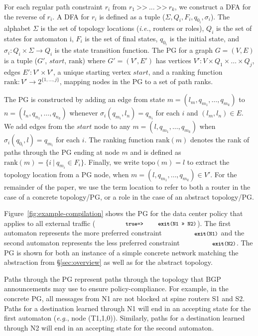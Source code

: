 \documentclass[numbers, 10pt, preprint]{sigplanconf}
\newcommand{\EG}{\emph{e.g.}}
\newcommand{\IE}{\emph{i.e.}}
\newcommand{\set}[1]{\ensuremath{\{ #1 \} }}
\newcommand{\CD}[1]{\texttt{\small #1}}
\newcommand{\KW}[1]{\texttt{\small\bfseries{#1}}}
\newcommand{\True}{\CD{true}}
\newcommand{\Prefer}{\texttt{>>}}
\newcommand{\Path}{\texttt{=>}}
\newcommand{\Exit}{\KW{exit}}
\newcommand{\Topo}[1]{\ensuremath{{\mathrm{topo}}(#1)}}
\newcommand{\Pref}{\ensuremath{\mathrm{rank}}}
\begin{document}
For each regular path constraint $r_i$ from $r_1 ~\Prefer~ ... ~\Prefer~ r_k$, we construct a DFA for the reverse of $r_i$. A DFA for $r_i$ is defined as a tuple ($\Sigma, Q_i, F_i, q_{0_i}, \sigma_i$). The alphabet $\Sigma$ is the set of topology locations (\IE, routers or roles), $Q_i$ is the set of states for automaton i, $F_i$ is the set of final states, $q_{0_i}$ is the initial state, and $\sigma_i \colon Q_i \times \Sigma \rightarrow Q_i$ is the state transition function.
%
The PG for a graph $G=(V,E)$ is a tuple ($G'$, $start$, \Pref) where $G' = (V',E')$ has
vertices $V' \colon V \times Q_1 \times \dots \times Q_j$,
edges $E' \colon V' \times V'$,
a unique starting vertex $start$,
and a ranking function $\Pref \colon V' \rightarrow 2^{\set{1, \dots, j}}$, mapping nodes in the PG to a set of path ranks.

The PG is constructed by adding an edge from state $m = (l_m, q_{m_1}, \dots, q_{m_k})$ to $n = (l_n, q_{n_1}, \dots, q_{n_k})$ whenever $\sigma_i(q_{m_i}, l_n) = q_{n_i}$ for each $i$ and $(l_m,l_n) \in E$.
%
We add edges from the $\mathit{start}$ node to any $m = (l, q_{m_1}, \dots, q_{m_k})$ when $\sigma_i(q_{0_i}, l) = q_{m_i}$ for each $i$.
%
The ranking function $\Pref(m)$ denotes the rank of paths through the PG ending at node $m$ and is defined as $\Pref(m) = \set{i~\vert~q_{m_i} \in F_i}$.
%
Finally, we write $\Topo{m} = l$ to extract the topology location from a PG node, when $m = (l, q_{m_1}, \dots, q_{m_k}) \in V'$. For the remainder of the paper, we use the term location to refer to both a router in the case of a concrete topology/PG, or a role in the case of an abstract topology/PG.

Figure~\ref{fig:example-compilation} shows the PG for the data center policy that applies to all external traffic ($\CD{\True \Path \Exit(N1~\Prefer~N2)}$).
%
%
The first automaton represents the more preferred constraint $\CD{\Exit(N1)}$ and the second automaton represents the less preferred constraint $\CD{\Exit(N2)}$. The PG is shown for both an instance of a simple concrete network matching the abstraction from \S\ref{sec:overview} as well as for the abstract topology.

Paths through the PG represent paths through the topology that BGP announcements may use to ensure policy-compliance. For example, in the concrete PG, all messages from N1 are not blocked at spine routers S1 and S2. Paths for a destination learned through N1 will end in an accepting state for the first automaton (\EG, node (T1,1,0)). Similarly, paths for a destination learned through N2 will end in an accepting state for the second automaton.
\end{document}
